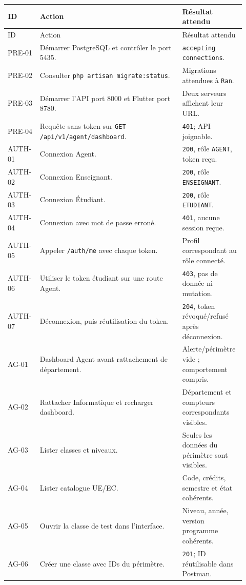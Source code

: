 \documentclass[10pt,a4paper]{article}
\begin{document}
\begin{longtable}{p{0.12\linewidth}p{0.58\linewidth}p{0.22\linewidth}}
\toprule
ID & Action & Résultat attendu \\
\midrule
\endfirsthead
\toprule ID & Action & Résultat attendu \\\midrule
\endhead
PRE-01 & Démarrer PostgreSQL et contrôler le port 5435. & \texttt{accepting connections}. \\
PRE-02 & Consulter \texttt{php artisan migrate:status}. & Migrations attendues à \texttt{Ran}. \\
PRE-03 & Démarrer l’API port 8000 et Flutter port 8780. & Deux serveurs affichent leur URL. \\
PRE-04 & Requête sans token sur \texttt{GET /api/v1/agent/dashboard}. & \texttt{401}; API joignable. \\
AUTH-01 & Connexion Agent. & \texttt{200}, rôle \texttt{AGENT}, token reçu. \\
AUTH-02 & Connexion Enseignant. & \texttt{200}, rôle \texttt{ENSEIGNANT}. \\
AUTH-03 & Connexion Étudiant. & \texttt{200}, rôle \texttt{ETUDIANT}. \\
AUTH-04 & Connexion avec mot de passe erroné. & \texttt{401}, aucune session reçue. \\
AUTH-05 & Appeler \texttt{/auth/me} avec chaque token. & Profil correspondant au rôle connecté. \\
AUTH-06 & Utiliser le token étudiant sur une route Agent. & \texttt{403}, pas de donnée ni mutation. \\
AUTH-07 & Déconnexion, puis réutilisation du token. & \texttt{204}, token révoqué/refusé après déconnexion. \\
AG-01 & Dashboard Agent avant rattachement de département. & Alerte/périmètre vide ; comportement compris. \\
AG-02 & Rattacher Informatique et recharger dashboard. & Département et compteurs correspondants visibles. \\
AG-03 & Lister classes et niveaux. & Seules les données du périmètre sont visibles. \\
AG-04 & Lister catalogue UE/EC. & Code, crédits, semestre et état cohérents. \\
AG-05 & Ouvrir la classe de test dans l’interface. & Niveau, année, version programme cohérents. \\
AG-06 & Créer une classe avec IDs du périmètre. & \texttt{201}; ID réutilisable dans Postman. \\

\end{longtable}
\end{document}
